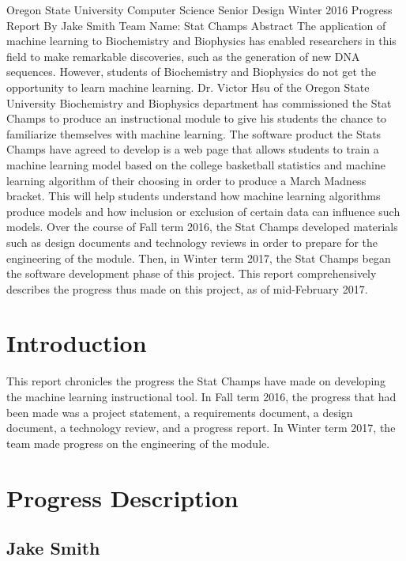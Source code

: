\documentclass[letterpaper, 10pt,titlepage]{article}
\begin{document}
\begin{center}

Oregon State University Computer Science Senior Design Winter 2016
\bigbreak
Progress Report
\bigbreak
By Jake Smith
\bigbreak
Team Name: Stat Champs
\bigbreak
\vspace{3.0cm}
Abstract
\bigbreak
The application of machine learning to Biochemistry and Biophysics has enabled researchers in this field to make remarkable discoveries, such as the generation of new DNA sequences. However, students of Biochemistry and Biophysics do not get the opportunity to learn machine learning. Dr. Victor Hsu of the Oregon State University Biochemistry and Biophysics department has commissioned the Stat Champs to produce an instructional module to give his students the chance to familiarize themselves with machine learning. The software product the Stats Champs have agreed to develop is a web page that allows students to train a machine learning model based on the college basketball statistics and machine learning algorithm of their choosing in order to produce a March Madness bracket. This will help students understand how machine learning algorithms produce models and how inclusion or exclusion of certain data can influence such models. Over the course of Fall term 2016, the Stat Champs developed materials such as design documents and technology reviews in order to prepare for the engineering of the module. Then, in Winter term 2017, the Stat Champs began the software development phase of this project. This report comprehensively describes the progress thus made on this project, as of mid-February 2017.
\newpage
\end{center}

\tableofcontents

\newpage
\section{Introduction}
	This report chronicles the progress the Stat Champs have made on developing the machine learning instructional tool. In Fall term 2016, the progress that had been made was a project statement, a requirements document, a design document, a technology review, and a progress report. In Winter term 2017, the team made progress on the engineering of the module.
\section{Progress Description}
\subsection{Jake Smith}
\end{document}

